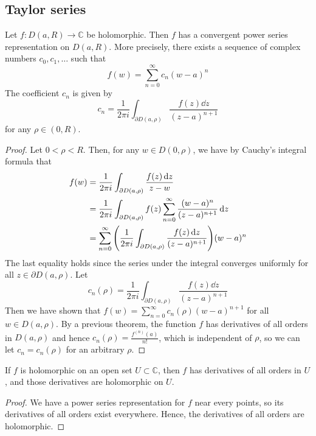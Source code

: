 \subsection{Taylor series}
\begin{theorem}
	Let \( f \colon D(a,R) \to \mathbb C \) be holomorphic.
	Then \( f \) has a convergent power series representation on \( D(a,R) \).
	More precisely, there exists a sequence of complex numbers \( c_0, c_1, \dots \) such that
	\[
		f(w) = \sum_{n=0}^\infty c_n (w-a)^n
	\]
	The coefficient \( c_n \) is given by
	\[
		c_n = \frac{1}{2\pi i} \int_{\partial D(a,\rho)} \frac{f(z) \dd{z}}{(z-a)^{n+1}}
	\]
	for any \( \rho \in (0,R) \).
\end{theorem}
\begin{proof}
	Let \( 0 < \rho < R \).
	Then, for any \( w \in D(0,\rho) \), we have by Cauchy's integral formula that
	\begin{align*}
		f(w) & = \frac{1}{2\pi i}\int_{\partial D(a,\rho)} \frac{f(z) \dd{z}}{z-w}                                           \\
		     & = \frac{1}{2\pi i}\int_{\partial D(a,\rho)} f(z) \sum_{n=0}^\infty \frac{(w-a)^n}{(z-a)^{n+1}} \dd{z}         \\
		     & = \sum_{n=0}^\infty \qty( \frac{1}{2\pi i}\int_{\partial D(a,\rho)} \frac{f(z) \dd{z}}{(z-a)^{n+1}} ) (w-a)^n \\
	\end{align*}
	The last equality holds since the series under the integral converges uniformly for all \( z \in \partial D(a,\rho) \).
	Let
	\[
		c_n(\rho) = \frac{1}{2\pi i} \int_{\partial D(a,\rho)} \frac{f(z) \dd{z}}{(z-a)^{n+1}}
	\]
	Then we have shown that \( f(w) = \sum_{n=0}^\infty c_n(\rho)(w-a)^{n+1} \) for all \( w \in D(a,\rho) \).
	By a previous theorem, the function \( f \) has derivatives of all orders in \( D(a,\rho) \) and hence \( c_n(\rho) = \frac{f^{(n)}(a)}{n!} \), which is independent of \( \rho \), so we can let \( c_n = c_n(\rho) \) for an arbitrary \( \rho \).
\end{proof}
\begin{corollary}
	If \( f \) is holomorphic on an open set \( U \subset \mathbb C \), then \( f \) has derivatives of all orders in \( U \), and those derivatives are holomorphic on \( U \).
\end{corollary}
\begin{proof}
	We have a power series representation for \( f \) near every points, so its derivatives of all orders exist everywhere.
	Hence, the derivatives of all orders are holomorphic.
\end{proof}
